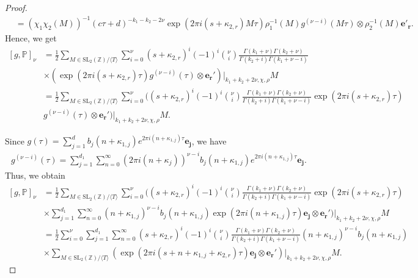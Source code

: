 \documentclass[11pt]{amsart}
\theoremstyle{definition}
\theoremstyle{remark}
\numberwithin{equation}{section}
\renewcommand{\(}{\left(}
\renewcommand{\)}{\right)}
\begin{document}
\begin{proof}
\begin{equation*}
\begin{aligned}
            &=\left(\chi_1\chi_2(M)\right)^{-1}(c\tau+d)^{-k_1-k_2-2\nu}\exp\left(2\pi i (s+\kappa_{2,r})M\tau\right)\rho_1^{-1}(M)g^{(\nu-i)}(M\tau)\otimes \rho_2^{-1}(M)\mathbf{e'_r}.
        \end{aligned}
    \end{equation*}
    Hence, we get 
    \begin{equation*}
        \begin{aligned}
            [g,\mathbb{P}]_{\nu}&=\frac{1}{2}\sum_{M\in \mathrm{SL}_{2}(\mathbb{Z})/\langle T \rangle }\sum_{i=0}^{\nu}(s+\kappa_{2,r})^{i}(-1)^{i}\binom{\nu}{i}\frac{\Gamma(k_1+\nu)\Gamma(k_2+\nu)}{\Gamma(k_2+i)\Gamma(k_1+\nu-i)}\\
            &\times \left(\exp(2\pi i (s+\kappa_{2,r})\tau)g^{(\nu-i)}(\tau) \otimes \mathbf{e_r'}\right)|_{k_1+k_2+2\nu,\chi,\rho}M\\
            &=\frac{1}{2}\sum_{M\in \mathrm{SL}_{2}(\mathbb{Z})/\langle T \rangle}\sum_{i=0}^{\nu}\bigg( (s+\kappa_{2,r})^{i}(-1)^{i}\binom{\nu}{i}\frac{\Gamma(k_1+\nu)\Gamma(k_2+\nu)}{\Gamma(k_2+i)\Gamma(k_1+\nu-i)}\exp(2\pi i (s+\kappa_{2,r})\tau)\\
            &g^{(\nu-i)}(\tau) \otimes \mathbf{e_r'}\bigg)|_{k_1+k_2+2\nu,\chi,\rho}M.
        \end{aligned}
    \end{equation*}

    Since $g(\tau)=\sum_{j=1}^{d} b_j(n+\kappa_{1,j})e^{2\pi i (n+\kappa_{1,j})\tau}\mathbf{e_j}$, we have 
    \begin{equation*}
        \begin{aligned}
            g^{(\nu-i)}(\tau)=\sum_{j=1}^{d_1}\sum_{n=0}^{\infty} (2\pi i (n+\kappa_j))^{\nu-i} b_j(n+\kappa_{1,j}) e^{2\pi i (n+\kappa_{1,j})\tau}\mathbf{e_j}.
        \end{aligned}
    \end{equation*}
    Thus, we obtain
    \begin{equation}\label{eq 1}
        \begin{aligned}
            [g,\mathbb{P}]_{\nu}&=\frac{1}{2}\sum_{M\in \mathrm{SL}_{2}(\mathbb{Z})/\langle T \rangle}\sum_{i=0}^{\nu}\bigg( (s+\kappa_{2,r})^{i}(-1)^{i}\binom{\nu}{i}\frac{\Gamma(k_1+\nu)\Gamma(k_2+\nu)}{\Gamma(k_2+i)\Gamma(k_1+\nu-i)}\exp(2\pi i (s+\kappa_{2,r})\tau)\\
            &\times\sum_{j=1}^{d_1}\sum_{n=0}^{\infty}  (n+\kappa_{1,j})^{\nu-i} b_j(n+\kappa_{1,j}) \exp(2\pi i (n+\kappa_{1,j})\tau)\mathbf{e_j}
            \otimes \mathbf{e_r'}\bigg)|_{k_1+k_2+2\nu,\chi,\rho}M\\
            &=\frac{1}{2}\sum_{i=0}^{\nu}\sum_{j=1}^{d_1}\sum_{n=0}^{\infty}(s+\kappa_{2,r})^{i}(-1)^{i}\binom{\nu}{i}\frac{\Gamma(k_1+\nu)\Gamma(k_2+\nu)}{\Gamma(k_2+i)\Gamma(k_1+\nu-i)} (n+\kappa_{1,j})^{\nu-i} b_j(n+\kappa_{1,j})\\
            &\times \sum_{M\in \mathrm{SL}_{2}(\mathbb{Z})/\langle T \rangle} \left(\exp(2\pi i (s+n+\kappa_{1,j}+\kappa_{2,r})\tau) \mathbf{e_j}\otimes \mathbf{e_r'}\right)|_{k_1+k_2+2\nu,\chi,\rho}M.
        \end{aligned}
    \end{equation}
    

\end{proof}
\end{document}
